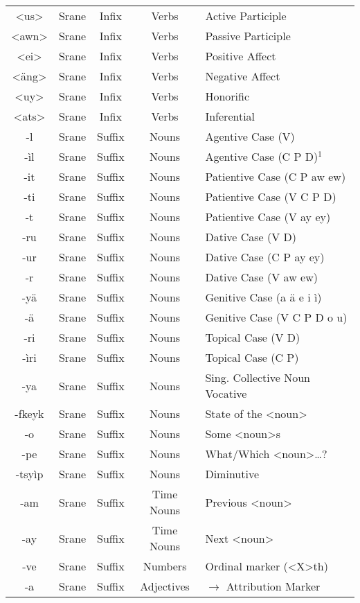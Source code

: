\begin{center}
\begin{longtable}[c]{|c c c c l|}
{<us>} & Srane & Infix & Verbs & Active Participle\\
{<awn>} & Srane & Infix & Verbs & Passive Participle\\
{<ei>} & Srane & Infix & Verbs & Positive Affect\\
{<äng>} & Srane & Infix & Verbs & Negative Affect\\
{<uy>} & Srane & Infix & Verbs & Honorific\\
{<ats>} & Srane & Infix & Verbs & Inferential\\
{-l} & Srane & Suffix & Nouns & Agentive Case (V)\\
{-ìl} & Srane & Suffix & Nouns & Agentive Case (C P D)$^1$\\
{-it} & Srane & Suffix & Nouns & Patientive Case (C P aw ew)\\
{-ti} & Srane & Suffix & Nouns & Patientive Case (V C P D)\\
{-t} & Srane & Suffix & Nouns & Patientive Case (V ay ey)\\
{-ru} & Srane & Suffix & Nouns & Dative Case (V D)\\
{-ur} & Srane & Suffix & Nouns & Dative Case (C P ay ey)\\
{-r} & Srane & Suffix & Nouns & Dative Case (V aw ew)\\
{-yä} & Srane & Suffix & Nouns & Genitive Case (a ä e i ì)\\
{-ä} & Srane & Suffix & Nouns & Genitive Case (V C P D o u)\\
{-ri} & Srane & Suffix & Nouns & Topical Case (V D)\\
{-ìri} & Srane & Suffix & Nouns & Topical Case (C P)\\
{-ya} & Srane & Suffix & Nouns & Sing. Collective Noun Vocative\\
{-fkeyk} & Srane & Suffix & Nouns & State of the <noun>\\
{-o} & Srane & Suffix & Nouns & Some <noun>s\\
{-pe} & Srane & Suffix & Nouns & What/Which <noun>\ldots ?\\
{-tsyìp} & Srane & Suffix & Nouns & Diminutive\\
{-am} & Srane & Suffix & Time Nouns & Previous <noun>\\
{-ay} & Srane & Suffix & Time Nouns & Next <noun>\\
{-ve} & Srane & Suffix & Numbers & Ordinal marker (<X>th)\\
{-a} & Srane & Suffix & Adjectives & $\rightarrow$ Attribution Marker\\

\end{longtable}
\end{center}
